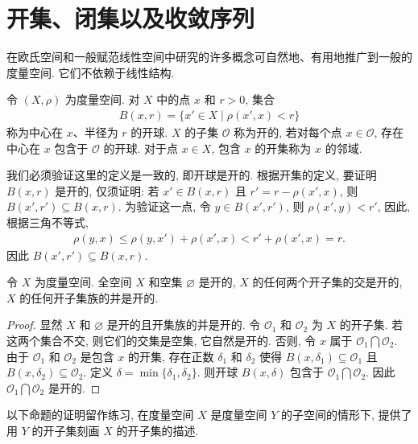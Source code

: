 \documentclass[../../main.tex]{subfiles}
\begin{document}
\section{开集、闭集以及收敛序列}\label{section:ch09-开集闭集收敛序列}

在欧氏空间和一般赋范线性空间中研究的许多概念可自然地、有用地推广到一般的度量空间. 它们不依赖于线性结构.

\begin{definition}[开球与开集]\label{definition:ch09-开球开集}
令 $(X,\rho)$ 为度量空间. 对 $X$ 中的点 $x$ 和 $r>0$, 集合
\begin{align*}
B(x,r)=\{x'\in X\mid\rho(x',x)<r\}
\end{align*}
称为中心在 $x$、半径为 $r$ 的开球. $X$ 的子集 $\mathcal{O}$ 称为开的, 若对每个点 $x\in\mathcal{O}$, 存在中心在 $x$ 包含于 $\mathcal{O}$ 的开球. 对于点 $x\in X$, 包含 $x$ 的开集称为 $x$ 的邻域.
\end{definition}

我们必须验证这里的定义是一致的, 即开球是开的. 根据开集的定义, 要证明 $B(x,r)$ 是开的, 仅须证明: 若 $x'\in B(x,r)$ 且 $r'=r-\rho(x',x)$, 则 $B(x',r')\subseteq B(x,r)$. 为验证这一点, 令 $y\in B(x',r')$, 则 $\rho(x',y)<r'$, 因此, 根据三角不等式,
\begin{align*}
\rho(y,x)\leqslant\rho(y,x')+\rho(x',x)<r'+\rho(x',x)=r.
\end{align*}
因此 $B(x',r')\subseteq B(x,r)$.

\begin{proposition}\label{proposition:ch09-开集运算}
令 $X$ 为度量空间. 全空间 $X$ 和空集 $\varnothing $ 是开的, $X$ 的任何两个开子集的交是开的, $X$ 的任何开子集族的并是开的.
\end{proposition}

\begin{proof}
显然 $X$ 和 $\varnothing $ 是开的且开集族的并是开的. 令 $\mathcal{O}_{1}$ 和 $\mathcal{O}_{2}$ 为 $X$ 的开子集. 若这两个集合不交, 则它们的交集是空集, 它自然是开的. 否则, 令 $x$ 属于 $\mathcal{O}_{1}\bigcap\mathcal{O}_{2}$. 由于 $\mathcal{O}_{1}$ 和 $\mathcal{O}_{2}$ 是包含 $x$ 的开集, 存在正数 $\delta_{1}$ 和 $\delta_{2}$ 使得 $B(x,\delta_{1})\subseteq\mathcal{O}_{1}$ 且 $B(x,\delta_{2})\subseteq\mathcal{O}_{2}$. 定义 $\delta=\min\{\delta_{1},\delta_{2}\}$. 则开球 $B(x,\delta)$ 包含于 $\mathcal{O}_{1}\bigcap\mathcal{O}_{2}$. 因此 $\mathcal{O}_{1}\bigcap\mathcal{O}_{2}$ 是开的.
\end{proof}

以下命题的证明留作练习, 在度量空间 $X$ 是度量空间 $Y$ 的子空间的情形下, 提供了用 $Y$ 的开子集刻画 $X$ 的开子集的描述.
\end{document}
